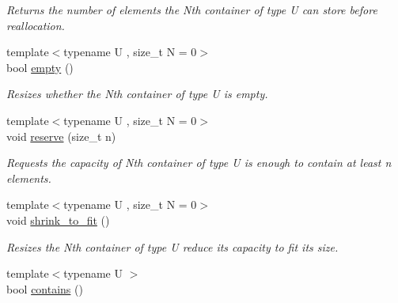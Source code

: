 \begin{DoxyCompactItemize}
\begin{DoxyCompactList}\small\item\em Returns the number of elements the Nth container of type U can store before reallocation. \end{DoxyCompactList}\item 
\hypertarget{classheterogeneous_1_1heterovector_3_01_t_00_01_types_8_8_8_4_a3941c5fd1fbd3b2926ff94d80096d796}{}{\footnotesize template$<$typename U , size\+\_\+t N = 0$>$ }\\bool \hyperlink{classheterogeneous_1_1heterovector_3_01_t_00_01_types_8_8_8_4_a3941c5fd1fbd3b2926ff94d80096d796}{empty} ()\label{classheterogeneous_1_1heterovector_3_01_t_00_01_types_8_8_8_4_a3941c5fd1fbd3b2926ff94d80096d796}

\begin{DoxyCompactList}\small\item\em Resizes whether the Nth container of type U is empty. \end{DoxyCompactList}\item 
\hypertarget{classheterogeneous_1_1heterovector_3_01_t_00_01_types_8_8_8_4_af5f27078881c6b0ba42e7853b2c445d2}{}{\footnotesize template$<$typename U , size\+\_\+t N = 0$>$ }\\void \hyperlink{classheterogeneous_1_1heterovector_3_01_t_00_01_types_8_8_8_4_af5f27078881c6b0ba42e7853b2c445d2}{reserve} (size\+\_\+t n)\label{classheterogeneous_1_1heterovector_3_01_t_00_01_types_8_8_8_4_af5f27078881c6b0ba42e7853b2c445d2}

\begin{DoxyCompactList}\small\item\em Requests the capacity of Nth container of type U is enough to contain at least n elements. \end{DoxyCompactList}\item 
\hypertarget{classheterogeneous_1_1heterovector_3_01_t_00_01_types_8_8_8_4_a226b721110b360b3bdd3840d25fed0ab}{}{\footnotesize template$<$typename U , size\+\_\+t N = 0$>$ }\\void \hyperlink{classheterogeneous_1_1heterovector_3_01_t_00_01_types_8_8_8_4_a226b721110b360b3bdd3840d25fed0ab}{shrink\+\_\+to\+\_\+fit} ()\label{classheterogeneous_1_1heterovector_3_01_t_00_01_types_8_8_8_4_a226b721110b360b3bdd3840d25fed0ab}

\begin{DoxyCompactList}\small\item\em Resizes the Nth container of type U reduce its capacity to fit its size. \end{DoxyCompactList}\item 
\hypertarget{classheterogeneous_1_1heterovector_3_01_t_00_01_types_8_8_8_4_a11ae03a75b58d7531452520c16565b5e}{}{\footnotesize template$<$typename U $>$ }\\bool \hyperlink{classheterogeneous_1_1heterovector_3_01_t_00_01_types_8_8_8_4_a11ae03a75b58d7531452520c16565b5e}{contains} ()\label{classheterogeneous_1_1heterovector_3_01_t_00_01_types_8_8_8_4_a11ae03a75b58d7531452520c16565b5e}


\end{DoxyCompactItemize}
